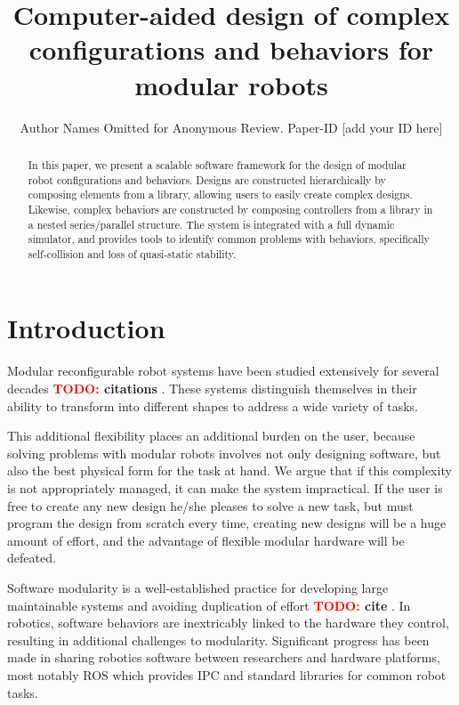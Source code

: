 \documentclass[conference]{IEEEtran}
\theoremstyle{definition}
\newcommand{\TODO}[1]{ {\bf \textcolor{red}{TODO:} #1 }}
\begin{document}
\title{Computer-aided design of complex configurations and behaviors for modular robots}

\author{Author Names Omitted for Anonymous Review. Paper-ID [add your ID here]}

\maketitle

\begin{abstract}
In this paper, we present a scalable software framework for the design of
modular robot configurations and behaviors. Designs are constructed
hierarchically by composing elements from a library, allowing users to easily
create complex designs.  Likewise, complex behaviors are constructed by
composing controllers from a library in a nested series/parallel structure. The
system is integrated with a full dynamic simulator, and provides tools to
identify common problems with behaviors, specifically self-collision and loss
of quasi-static stability.

\end{abstract}

\section{Introduction}
Modular reconfigurable robot systems have been studied extensively for several
decades \TODO{citations}.  These systems distinguish themselves in their
ability to transform into different shapes to address a wide variety of tasks.

This additional flexibility places an additional burden on the user, because
solving problems with modular robots involves not only designing  software,
but also the best physical form for the task at hand. We argue that if this
complexity is not appropriately managed, it can make the system
impractical. If the user is free to create any new design he/she pleases to
solve a new task, but must program the design from scratch every time, creating
new designs will be a huge amount of effort, and the advantage of flexible modular
hardware will be defeated.

Software modularity is a well-established practice for developing large
maintainable systems and avoiding duplication of effort \TODO{cite}. In robotics, software
behaviors are inextricably linked to the hardware they control, resulting in
additional challenges to modularity. Significant progress has been made in
sharing robotics software between researchers
and hardware platforms, most notably
ROS which provides IPC and standard libraries for common robot tasks. 
\end{document}
